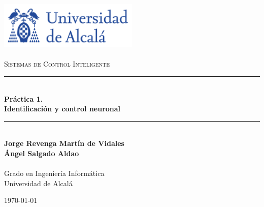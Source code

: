 \documentclass[a4paper, 12pt]{article}
\newcommand{\HRule}{\rule{\linewidth}{0.5mm}}
\begin{document}
    \begin{titlepage}
        \begin{center}
            \includegraphics[width=0.5\textwidth]{figures/logoUAH.png}~\\[2cm]
            
            \textsc{\Large \\Sistemas de Control Inteligente}\\[2cm]
            
            \HRule \\[0.4cm]
            {\LARGE \bfseries Práctica 1. \\ Identificación y control neuronal  \\[0.4cm]}
            \HRule \\[3cm]
            
            \large\textbf{Jorge Revenga Martín de Vidales}\\
            \large\textbf{Ángel Salgado Aldao}\\
            \large\textbf{}\\ Grado en Ingeniería Informática \\ Universidad de Alcalá
            
            \vfill
            
            {\large \today}
        \end{center}
    \end{titlepage}

    \pagestyle{fancy}
    \fancyhf{} %
    \fancyfoot[RO,LE]{\thepage}  %
    \newpage
    
    \thispagestyle{plain}
    \tableofcontents
    \newpage

    \part{}
    
\end{document}
